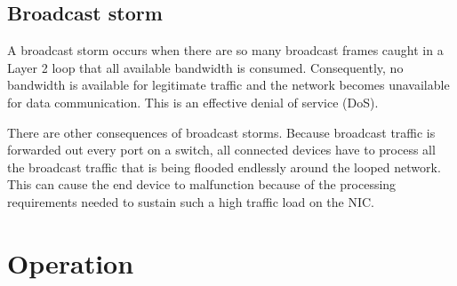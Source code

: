 \subsection{Broadcast storm}
A broadcast storm occurs when there are so many broadcast frames caught in a Layer 2 loop that all available bandwidth is consumed. Consequently, no bandwidth is available for legitimate traffic and the network becomes unavailable for data communication. This is an effective denial of service (DoS).\par 
There are other consequences of broadcast storms. Because broadcast traffic is forwarded out every port on a switch, all connected devices have to process all the broadcast traffic that is being flooded endlessly around the looped network. This can cause the end device to malfunction because of the processing requirements needed to sustain such a high traffic load on the NIC.
\section{Operation}

